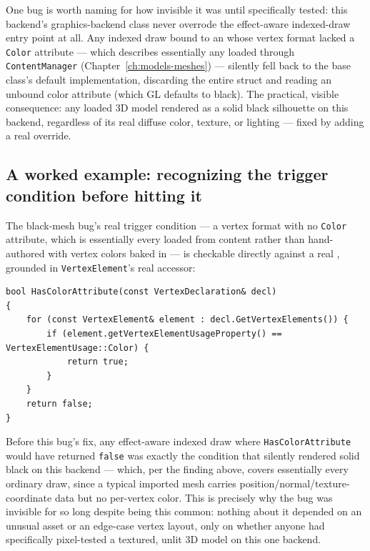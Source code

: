 One bug is worth naming for how invisible it was until specifically tested: this backend's
graphics-backend class never overrode the effect-aware indexed-draw entry point at all. Any
indexed draw bound to an  whose vertex format lacked a \texttt{Color}
attribute --- which describes essentially any  loaded through
\texttt{ContentManager} (Chapter~\ref{ch:models-meshes}) --- silently fell back to the base
class's default implementation, discarding the entire  struct and
reading an unbound color attribute (which GL defaults to black). The practical, visible
consequence: any loaded 3D model rendered as a solid black silhouette on this backend,
regardless of its real diffuse color, texture, or lighting --- fixed by adding a real
override.

\subsection{A worked example: recognizing the trigger condition before hitting it}

The black-mesh bug's real trigger condition --- a vertex format with no \texttt{Color}
attribute, which is essentially every  loaded from content rather than
hand-authored with vertex colors baked in --- is checkable directly against a real
, grounded in \texttt{VertexElement}'s real accessor:

\begin{lstlisting}
bool HasColorAttribute(const VertexDeclaration& decl)
{
    for (const VertexElement& element : decl.GetVertexElements()) {
        if (element.getVertexElementUsageProperty() == VertexElementUsage::Color) {
            return true;
        }
    }
    return false;
}
\end{lstlisting}

Before this bug's fix, any effect-aware indexed draw where \texttt{HasColorAttribute} would
have returned \texttt{false} was exactly the condition that silently rendered solid black on
this backend --- which, per the finding above, covers essentially every ordinary
 draw, since a typical imported mesh carries position/normal/texture-coordinate
data but no per-vertex color. This is precisely why the bug was invisible for so long despite
being this common: nothing about it depended on an unusual asset or an edge-case vertex
layout, only on whether anyone had specifically pixel-tested a textured, unlit 3D model on
this one backend.

